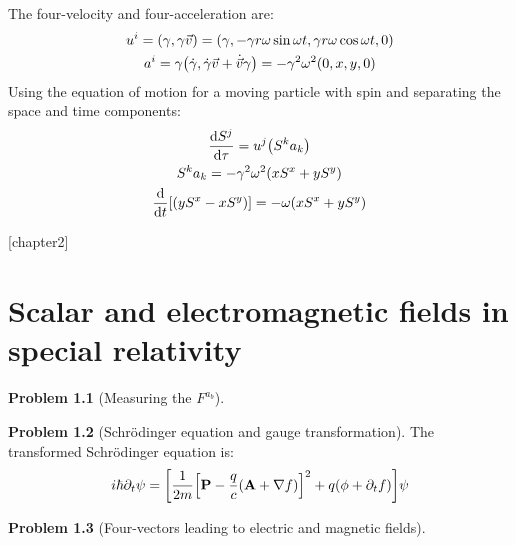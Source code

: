 \documentclass{report}
\theoremstyle{definition}
\begin{document}
\begin{chapter1}
	The four-velocity and four-acceleration are:
	\begin{gather*}
		u^i = \pqty{\gamma, \gamma \vec{v}} = \pqty{\gamma, -\gamma r\omega\sin\omega t, \gamma r\omega\cos\omega t, 0} \\
		a^i = \gamma\pqty{\dot{\gamma}, \dot{\gamma}\vec{v} + \dot{\vec{v}}\gamma} = -\gamma^2 \omega^2\pqty{0,x,y,0}
	\end{gather*}
	Using the equation of motion for a moving particle with spin and separating the space and time components:
	\begin{gather*}
		\dv{S^j}{\tau} = u^j \pqty{S^k a_k} \\
		S^k a_k = -\gamma^2 \omega^2 \pqty{xS^x + yS^y} \\
		\dv{t}\bqty{\pqty{yS^x - xS^y}} = -\omega\pqty{xS^x + yS^y}
	\end{gather*}
\end{chapter1}

\begin{chapter1}
	
\end{chapter1}


\newtheorem{chapter2}{Problem}
[chapter2]

\chapter{Scalar and electromagnetic fields in special relativity}
\begin{chapter2}[Measuring the $F^{a_b}$]
	
\end{chapter2}

\begin{chapter2}[Schr\"odinger equation and gauge transformation]
	The transformed Schr\"odinger equation is:
	\begin{gather*}
		i\hbar\partial_t \psi = \bqty{\frac{1}{2m}\bqty{\mathbf{P} - \frac{q}{c}\pqty{\mathbf A + \nabla f}}^2 + q\pqty{\phi + \partial_t f}}\psi
	\end{gather*}
\end{chapter2}

\begin{chapter2}[Four-vectors leading to electric and magnetic fields]
	
\end{chapter2}
\end{document}
